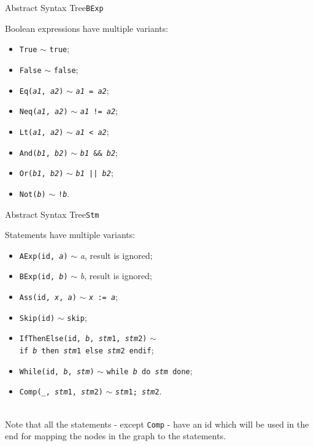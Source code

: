 \documentclass{beamer}
\begin{document}
\begin{frame}{Abstract Syntax Tree}{\texttt{BExp}}

    Boolean expressions have multiple variants:
    \begin{itemize}
        \item \texttt{True} $\sim$ \texttt{true};
        \item \texttt{False} $\sim$ \texttt{false};
        \item \texttt{Eq(\textit{a1}, \textit{a2})} $\sim$ \texttt{\textit{a1} = \textit{a2}};
        \item \texttt{Neq(\textit{a1}, \textit{a2})} $\sim$ \texttt{\textit{a1} != \textit{a2}};
        \item \texttt{Lt(\textit{a1}, \textit{a2})} $\sim$ \texttt{\textit{a1} < \textit{a2}};
        \item \texttt{And(\textit{b1}, \textit{b2})} $\sim$  \texttt{\textit{b1} \&\& \textit{b2}};
        \item \texttt{Or(\textit{b1}, \textit{b2})} $\sim$ \texttt{\textit{b1} || \textit{b2}};
        \item \texttt{Not(\textit{b})} $\sim$ \texttt{!\textit{b}}.
    \end{itemize}

\end{frame}

\begin{frame}{Abstract Syntax Tree}{\texttt{Stm}}

    Statements have multiple variants:
    \begin{itemize}
        \item \texttt{AExp(id, \textit{a})} $\sim$ \textit{a}, result is ignored;
        \item \texttt{BExp(id, \textit{b})} $\sim$ \textit{b}, result is ignored;
        \item \texttt{Ass(id, \textit{x}, \textit{a})} $\sim$ \texttt{\textit{x} := \textit{a}};
        \item \texttt{Skip(id)} $\sim$ \texttt{skip};
        \item \texttt{IfThenElse(id, \textit{b}, \textit{stm}1, \textit{stm}2)} $\sim$ \\
              \hskip 1.5cm \texttt{if \textit{b} then \textit{stm}1 else \textit{stm}2 endif};
        \item \texttt{While(id, \textit{b}, \textit{stm})} $\sim$ \texttt{while \textit{b} do \textit{stm} done};
        \item \texttt{Comp(\_, \textit{stm}1, \textit{stm}2)} $\sim$ \texttt{\textit{stm}1; \textit{stm}2}.
    \end{itemize}

    ~\\
    Note that all the statements - except \texttt{Comp} -  have an id which will be used in the end for mapping the nodes in the graph to the statements.

\end{frame}
\end{document}
